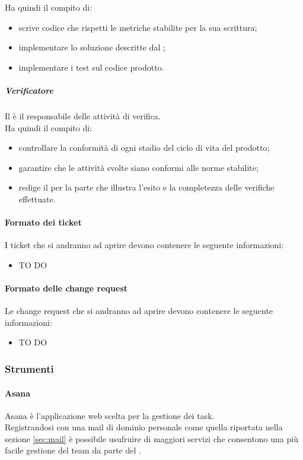 				Ha quindi il compito di:
					\begin{itemize}
						\item scrive codice che rispetti le metriche stabilite per la sua scrittura;
						\item implementare lo soluzione descritte dal \roleDesigner;
						\item implementare i test sul codice prodotto.
					\end{itemize}
				\subparagraph{Verificatore}
				Il \roleVerifier{} è il responsabile delle attività di verifica. \\
				Ha quindi il compito di:
					\begin{itemize}
						\item controllare la conformità di ogni stadio del ciclo di vita del prodotto;
						\item garantire che le attività svolte siano conformi alle norme stabilite;
						\item redige il \docNameVersionPdQ{} per la parte che illustra l'esito e la completezza delle verifiche effettuate.
					\end{itemize}
		
			\paragraph{Formato dei ticket}
			I ticket che si andranno ad aprire devono contenere le seguente informazioni:
				\begin{itemize}
					\item TO DO
				\end{itemize}
			\paragraph{Formato delle change request}
			Le change request che si andranno ad aprire devono contenere le seguente informazioni:
				\begin{itemize}
					\item TO DO
				\end{itemize}
	
	
		\subsubsection{Strumenti}
			\paragraph{Asana} \label{sec:Asana}
			Asana è l'applicazione web scelta per la gestione dei task.\\
			Registrandosi con una mail di dominio personale come quella riportata nella sezione \ref{sec:mail} è possibile usufruire di maggiori servizi che consentono una più facile gestione del team da parte del \roleProjectManager.
